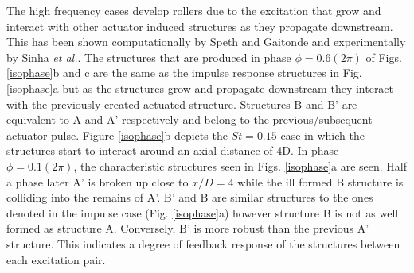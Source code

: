 \documentclass[english]{aiaa-tc}
\begin{document}
The high frequency cases develop rollers due to the excitation that grow and interact with other actuator induced structures as they propagate downstream. This has been shown computationally by Speth and Gaitonde\cite{speth2014} and experimentally by Sinha {\em et al.}\cite{sinha2013}. The structures that are produced in phase $\phi=0.6(2\pi)$ of Figs. \ref{isophase}b and c are the same as the impulse response structures in Fig. \ref{isophase}a but as the structures grow and propagate downstream they interact with the previously created actuated structure. Structures B and B' are equivalent to A and A' respectively and belong to the previous/subsequent actuator pulse. 
Figure \ref{isophase}b depicts the $St=0.15$ case in which the structures start to interact around an axial distance of 4D. In phase $\phi=0.1(2\pi)$, the characteristic structures seen in Figs. \ref{isophase}a are seen. Half a phase later A' is broken up close to $x/D=4$ while the ill formed B structure is colliding into the remains of A'. B' and B are similar structures to the ones denoted in the impulse case (Fig. \ref{isophase}a) however structure B is not as well formed as structure A. Conversely, B' is more robust than the previous A' structure. This indicates a degree of feedback response of the structures between each excitation pair.
\end{document}
